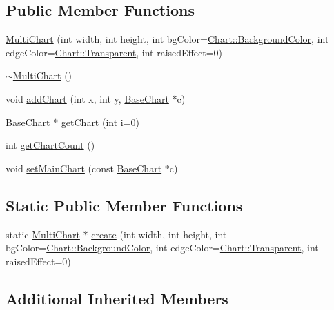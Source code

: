 \subsection*{Public Member Functions}
\begin{DoxyCompactItemize}
\item 
\hyperlink{class_multi_chart_abf2c503949698fbc07de9eab84ac5fdc}{Multi\+Chart} (int width, int height, int bg\+Color=\hyperlink{namespace_chart_abee0d882fdc9ad0b001245ad9fc64011a134193bde693b9d152d0c6dc59fa7d7f}{Chart\+::\+Background\+Color}, int edge\+Color=\hyperlink{namespace_chart_abee0d882fdc9ad0b001245ad9fc64011afc6811800a9e2582dac0157b6279f836}{Chart\+::\+Transparent}, int raised\+Effect=0)
\item 
\hyperlink{class_multi_chart_a72022b64771bd6dd61f4a69a12262c34}{$\sim$\+Multi\+Chart} ()
\item 
void \hyperlink{class_multi_chart_a8a41f5565f6914264044ddd99af9a6e9}{add\+Chart} (int x, int y, \hyperlink{class_base_chart}{Base\+Chart} $\ast$c)
\item 
\hyperlink{class_base_chart}{Base\+Chart} $\ast$ \hyperlink{class_multi_chart_a17712a61c4b4687e374049b3ea502d98}{get\+Chart} (int i=0)
\item 
int \hyperlink{class_multi_chart_a2e04657227a59f55f04433c0e0df1a2f}{get\+Chart\+Count} ()
\item 
void \hyperlink{class_multi_chart_a3769e8277675d5a1efb2ac44d45c9116}{set\+Main\+Chart} (const \hyperlink{class_base_chart}{Base\+Chart} $\ast$c)
\end{DoxyCompactItemize}
\subsection*{Static Public Member Functions}
\begin{DoxyCompactItemize}
\item 
static \hyperlink{class_multi_chart}{Multi\+Chart} $\ast$ \hyperlink{class_multi_chart_ad32164a35e145d046fbcf5ccd9c839de}{create} (int width, int height, int bg\+Color=\hyperlink{namespace_chart_abee0d882fdc9ad0b001245ad9fc64011a134193bde693b9d152d0c6dc59fa7d7f}{Chart\+::\+Background\+Color}, int edge\+Color=\hyperlink{namespace_chart_abee0d882fdc9ad0b001245ad9fc64011afc6811800a9e2582dac0157b6279f836}{Chart\+::\+Transparent}, int raised\+Effect=0)
\end{DoxyCompactItemize}
\subsection*{Additional Inherited Members}


